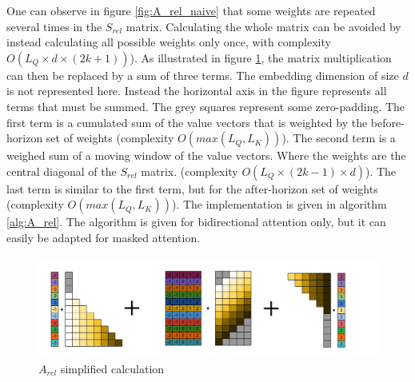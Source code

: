 One can observe in figure \ref{fig:A_rel_naive} that some weights are repeated several times in the
$S_{rel}$ matrix. Calculating the whole matrix can be avoided by
instead calculating all possible weights only once, with complexity
$O \left(L_Q\times d\times(2k+1)\right)$). As illustrated in figure \ref{fig:A_rel_linear}, the matrix multiplication can then be replaced by a sum of three terms. The embedding dimension of size $d$ is not represented here. Instead the horizontal axis in the figure represents all terms that must be summed. The grey squares represent some zero-padding. The first term is a cumulated sum of the value vectors that is weighted  by the before-horizon set of weights (complexity $O(max(L_Q, L_K))$). The second term is a weighed sum of a moving window of the value vectors. Where the weights are the central diagonal of the $S_{rel}$ matrix. (complexity $O(L_Q \times (2k-1) \times d)$). The last term is similar to the first term, but for the after-horizon set of weights (complexity $O(max(L_Q, L_K))$). The implementation is given in algorithm \ref{alg:A_rel}. The algorithm is given for bidirectional attention only, but it can easily be adapted for masked attention.

\begin{figure}
\centering
\includegraphics[width=0.9\linewidth]{images/S_rel_V_detailed.png}
\caption{$A_{rel}$ simplified calculation}
\label{fig:A_rel_linear}
\end{figure}

